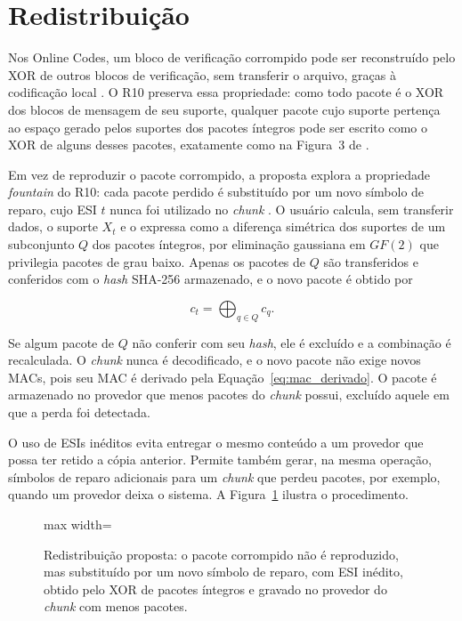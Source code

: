 \section{Redistribuição}
\label{sec:redistribuicao}

Nos Online Codes, um bloco de verificação corrompido pode ser reconstruído pelo XOR de outros blocos de verificação, sem transferir o arquivo, graças à codificação local \cite{maymounkov2003rateless,amaral2019hysail}. O R10 preserva essa propriedade: como todo pacote é o XOR dos blocos de mensagem de seu suporte, qualquer pacote cujo suporte pertença ao espaço gerado pelos suportes dos pacotes íntegros pode ser escrito como o XOR de alguns desses pacotes, exatamente como na Figura~3 de \cite{amaral2019hysail}.

Em vez de reproduzir o pacote corrompido, a proposta explora a propriedade \emph{fountain} do R10: cada pacote perdido é substituído por um novo símbolo de reparo, cujo \acrshort{ESI} $t$ nunca foi utilizado no \emph{chunk} \cite{luby2007rfc5053}. O usuário calcula, sem transferir dados, o suporte $X_t$ e o expressa como a diferença simétrica dos suportes de um subconjunto $Q$ dos pacotes íntegros, por eliminação gaussiana em $GF(2)$ que privilegia pacotes de grau baixo. Apenas os pacotes de $Q$ são transferidos e conferidos com o \emph{hash} SHA-256 armazenado, e o novo pacote é obtido por

\begin{equation}
	c_t = \bigoplus_{q \in Q} c_q.
	\label{eq:redistribuicao_xor}
\end{equation}

\noindent Se algum pacote de $Q$ não conferir com seu \emph{hash}, ele é excluído e a combinação é recalculada. O \emph{chunk} nunca é decodificado, e o novo pacote não exige novos \acrshort{MAC}s, pois seu \acrshort{MAC} é derivado pela Equação~\eqref{eq:mac_derivado}. O pacote é armazenado no provedor que menos pacotes do \emph{chunk} possui, excluído aquele em que a perda foi detectada.

O uso de \acrshort{ESI}s inéditos evita entregar o mesmo conteúdo a um provedor que possa ter retido a cópia anterior. Permite também gerar, na mesma operação, símbolos de reparo adicionais para um \emph{chunk} que perdeu pacotes, por exemplo, quando um provedor deixa o sistema. A Figura~\ref{fig:redistribuicao} ilustra o procedimento.

\begin{figure}[htbp]
	\centering
	\begin{adjustbox}{max width=\textwidth}
		
	\end{adjustbox}
	\caption{Redistribuição proposta: o pacote corrompido não é reproduzido, mas substituído por um novo símbolo de reparo, com \acrshort{ESI} inédito, obtido pelo XOR de pacotes íntegros e gravado no provedor do \emph{chunk} com menos pacotes.}
	\label{fig:redistribuicao}
\end{figure}

